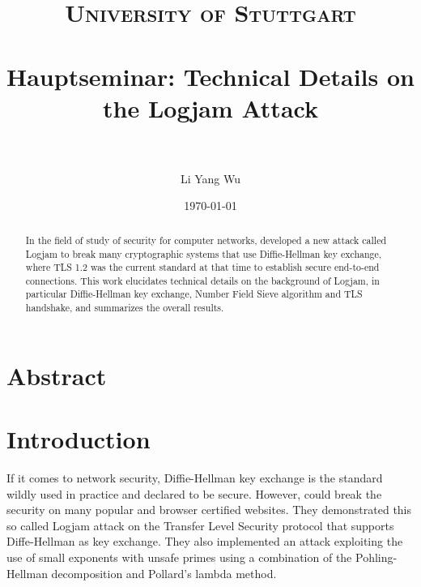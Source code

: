 \documentclass[paper=a4, fontsize=11pt]{scrartcl} %
\title{	
\normalfont \normalsize 
\textsc{University of Stuttgart} \\ [25pt] %
\horrule{0.5pt} \\[0.4cm] %
\huge Hauptseminar: Technical Details on the Logjam Attack \\ %
\horrule{2pt} \\[0.5cm] %
}
\author{Li Yang Wu} %
\date{\normalsize\today} %
\numberwithin{equation}{section} %
\numberwithin{figure}{section} %
\numberwithin{table}{section} %
\begin{document}
\clearpage
\thispagestyle{empty}
\maketitle %

\newpage
\tableofcontents

\newpage
\clearpage
{}%
\section*{Abstract}
\begin{abstract}
In the field of study of security for computer networks, \citep{Adrian:2015:IFS:2810103.2813707} developed a new attack called Logjam to break many cryptographic systems that use Diffie-Hellman key exchange, where TLS 1.2 was the current standard at that time to establish secure end-to-end connections. This work elucidates technical details on the background of Logjam, in particular Diffie-Hellman key exchange, Number Field Sieve algorithm and TLS handshake, and summarizes the overall results.
\end{abstract}
\section{Introduction}
If it comes to network security, Diffie-Hellman key exchange is the standard wildly used in practice and declared to be secure. However, \citep{Adrian:2015:IFS:2810103.2813707} could break the security on many popular and browser certified websites. They demonstrated this so called Logjam attack on the Transfer Level Security protocol that supports Diffe-Hellman as key exchange. They also implemented an attack exploiting the use of small exponents with unsafe primes using a combination of the Pohling-Hellman decomposition and Pollard's lambda method.
\end{document}
